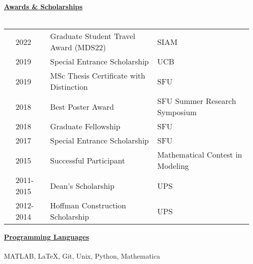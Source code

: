 \documentclass[letterpaper,11pt,oneside]{article}
\newcommand{\headr}[1]{\vspace{10pt}\uline{\Large{\textbf{#1}} \hfill } \\ \vspace{-10pt}\\}
\begin{document}
\headr{Awards \& Scholarships}

\begin{tabular}{@{} p{0.01cm} p{2cm} p{9cm} p{8cm}}
& 2022 & Graduate Student Travel Award (MDS22) & SIAM \\
& 2019 & Special Entrance Scholarship & UCB \\
& 2019 & MSc Thesis Certificate with Distinction & SFU \\
& 2018 & Best Poster Award & SFU Summer Research Symposium \\
& 2018 & Graduate Fellowship & SFU \\
& 2017 & Special Entrance Scholarship & SFU \\
& 2015 & Successful Participant & Mathematical Contest in Modeling \\
& 2011-2015 & Dean’s Scholarship & UPS\\
& 2012-2014 & Hoffman Construction Scholarship & UPS\\ 
\end{tabular}


\headr{Programming Languages}

MATLAB, \LaTeX, Git, Unix, Python, Mathematica\\



\end{document}
